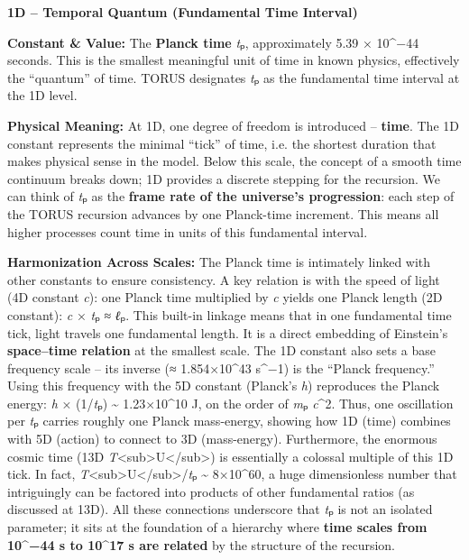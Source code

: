 \textbf{1D -- Temporal Quantum (Fundamental Time Interval)}

\textbf{Constant \& Value:} The \textbf{Planck time} \emph{t}ₚ,
approximately 5.39 × 10\^{}−44 seconds​. This is the smallest meaningful
unit of time in known physics, effectively the ``quantum'' of time.
TORUS designates \emph{t}ₚ as the fundamental time interval at the 1D
level.

\textbf{Physical Meaning:} At 1D, one degree of freedom is introduced --
\textbf{time}. The 1D constant represents the minimal ``tick'' of time,
i.e. the shortest duration that makes physical sense in the model​.
Below this scale, the concept of a smooth time continuum breaks down; 1D
provides a discrete stepping for the recursion. We can think of
\emph{t}ₚ as the \textbf{frame rate of the universe's progression}​:
each step of the TORUS recursion advances by one Planck-time increment.
This means all higher processes count time in units of this fundamental
interval.

\textbf{Harmonization Across Scales:} The Planck time is intimately
linked with other constants to ensure consistency. A key relation is
with the speed of light (4D constant \emph{c}): one Planck time
multiplied by \emph{c} yields one Planck length (2D constant): \emph{c}
× \emph{t}ₚ ≈ \emph{ℓ}ₚ​. This built-in linkage means that in one
fundamental time tick, light travels one fundamental length. It is a
direct embedding of Einstein's \textbf{space--time relation} at the
smallest scale. The 1D constant also sets a base frequency scale -- its
inverse (≈ 1.854×10\^{}43 s\^{}−1) is the ``Planck frequency.'' Using
this frequency with the 5D constant (Planck's \emph{h}) reproduces the
Planck energy: \emph{h} × (1/\emph{t}ₚ) \textasciitilde{} 1.23×10\^{}10
J, on the order of \emph{m}ₚ \emph{c}\^{}2​. Thus, one oscillation per
\emph{t}ₚ carries roughly one Planck mass-energy, showing how 1D (time)
combines with 5D (action) to connect to 3D (mass-energy). Furthermore,
the enormous cosmic time (13D
\emph{T}\textless{}sub\textgreater{}U\textless{}/sub\textgreater{}) is
essentially a colossal multiple of this 1D tick. In fact,
\emph{T}\textless{}sub\textgreater{}U\textless{}/sub\textgreater{}/\emph{t}ₚ
\textasciitilde{} 8×10\^{}60, a huge dimensionless number that
intriguingly can be factored into products of other fundamental ratios
(as discussed at 13D)​. All these connections underscore that \emph{t}ₚ
is not an isolated parameter; it sits at the foundation of a hierarchy
where \textbf{time scales from 10\^{}−44 s to 10\^{}17 s are related} by
the structure of the recursion.

